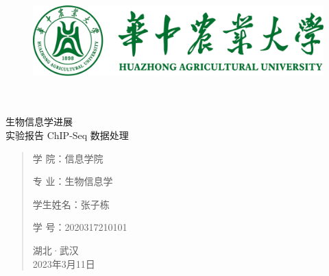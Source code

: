 \documentclass[UTF8]{ctexart}
\date{}
\begin{document}
	\begin{figure}[t]
		\centering
        \includegraphics[scale=0.7]{img/HZAU.png}
	\end{figure}

	\begin{center}
		\quad \\
		\quad \\
		\heiti \fontsize{45}{17} 生物信息学进展\\实验报告
		\vskip 3.5cm
		\heiti {} ChIP-Seq 数据处理
	\end{center}
	\vskip 3.0cm

	\begin{quotation}
		\heiti \fontsize{15}{15}
		\doublespacing
		\par\setlength\parindent{12em}
		\quad

		学\hspace{0.61cm} 院：信息学院

		专\hspace{0.61cm} 业：生物信息学

		学生姓名：张子栋

		学\hspace{0.61cm} 号：2020317210101

		\vskip 2cm
		\centering
        湖北·武汉\\
		2023年3月11日
	\end{quotation}
\end{document}
